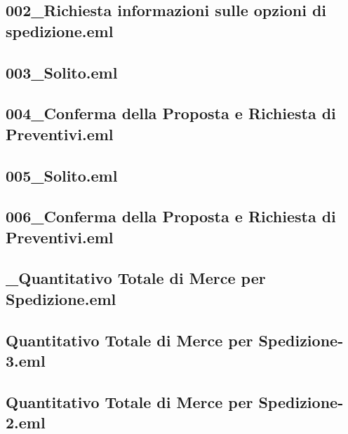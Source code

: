 \documentclass[a4paper,12pt]{report}
\begin{document}
\subsection{002\_Richiesta informazioni sulle opzioni di spedizione.eml}
\vspace{5pt}


\subsection{003\_Solito.eml}
\vspace{5pt}


\subsection{004\_Conferma della Proposta e Richiesta di Preventivi.eml}
\vspace{5pt}


\subsection{005\_Solito.eml}
\vspace{5pt}


\subsection{006\_Conferma della Proposta e Richiesta di Preventivi.eml}
\vspace{5pt}


\subsection{\_Quantitativo Totale di Merce per Spedizione.eml}
\vspace{5pt}


\subsection{Quantitativo Totale di Merce per Spedizione-3.eml}
\vspace{5pt}


\subsection{Quantitativo Totale di Merce per Spedizione-2.eml}
\vspace{5pt}

\end{document}
